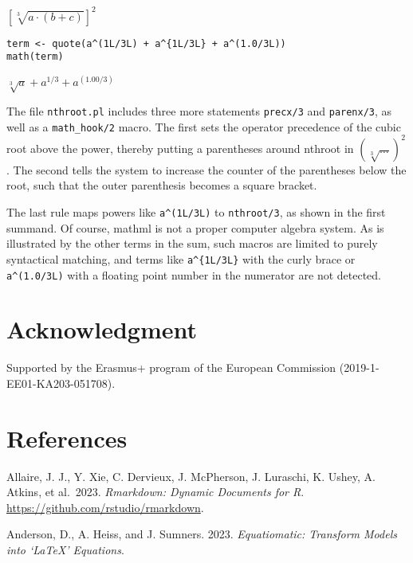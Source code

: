 \({\left[\sqrt[3]{{a}{\cdot}{\left({b}{+}{c}\right)}}\right]}^{2}\)

\begin{verbatim}
term <- quote(a^(1L/3L) + a^{1L/3L} + a^(1.0/3L))
math(term)
\end{verbatim}

\({{\sqrt[3]{a}}{+}{{a}^{{1}{/}{3}}}}{+}{{a}^{\left({1.00}{/}{3}\right)}}\)

The file \texttt{nthroot.pl} includes three more statements \texttt{precx/3} and
\texttt{parenx/3}, as well as a \texttt{math\_hook/2} macro. The first sets the
operator precedence of the cubic root above the power, thereby putting a
parentheses around nthroot in \((\sqrt[3]{\ldots})^2\). The second tells
the system to increase the counter of the parentheses below the root,
such that the outer parenthesis becomes a square bracket.

The last rule maps powers like \texttt{a\^{}(1L/3L)} to \texttt{nthroot/3}, as shown in
the first summand. Of course, mathml is not a proper computer algebra
system. As is illustrated by the other terms in the sum, such macros are
limited to purely syntactical matching, and terms like \texttt{a\^{}\{1L/3L\}} with
the curly brace or \texttt{a\^{}(1.0/3L)} with a floating point number in the
numerator are not detected.

\hypertarget{acknowledgment}{%
\section{Acknowledgment}\label{acknowledgment}}

Supported by the Erasmus+ program of the European Commission
(2019-1-EE01-KA203-051708).

\hypertarget{references}{%
\section*{References}\label{references}}

\hypertarget{refs}{}
\begin{CSLReferences}{0}{0}
\end{CSLReferences}

Allaire, J. J., Y. Xie, C. Dervieux, J. McPherson, J. Luraschi, K.
Ushey, A. Atkins, et al.~2023. \emph{Rmarkdown: Dynamic Documents for R}.
\url{https://github.com/rstudio/rmarkdown}.

Anderson, D., A. Heiss, and J. Sumners. 2023. \emph{Equatiomatic: Transform
Models into `LaTeX' Equations}.


